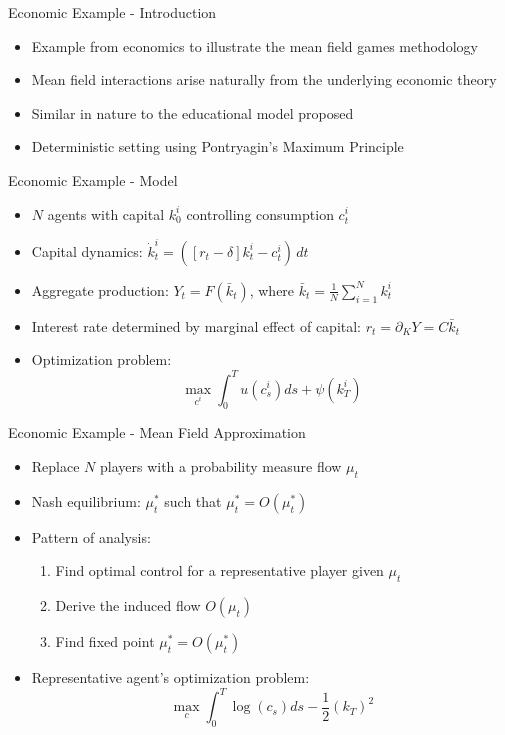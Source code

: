 \documentclass{beamer}
\begin{document}
\begin{frame}{Economic Example - Introduction}
\begin{itemize}
    \item Example from economics to illustrate the mean field games methodology
    \item Mean field interactions arise naturally from the underlying economic theory
    \item Similar in nature to the educational model proposed
    \item Deterministic setting using Pontryagin's Maximum Principle
\end{itemize}
\end{frame}

\begin{frame}{Economic Example - Model}
\begin{itemize}
    \item $N$ agents with capital $k_0^i$ controlling consumption $c_t^i$
    \item Capital dynamics: $\dot k_t^i = \left( \left[r_t - \delta \right] k_t^i - c_t^i \right)\, dt$
    \item Aggregate production: $Y_t = F(\bar k_t)$, where $\bar k_t = \frac{1}{N} \sum_{i = 1}^N k_t^i$
    \item Interest rate determined by marginal effect of capital: $r_t = \partial_K Y = C \bar k_t$
    \item Optimization problem: 
    \begin{equation}
        \max_{c^i } \int_0^T u(c^i_s) ds + \psi(k^i_T)
    \end{equation}
\end{itemize}
\end{frame}

\begin{frame}{Economic Example - Mean Field Approximation}
\begin{itemize}
    \item Replace $N$ players with a probability measure flow $\mu_t$
    \item Nash equilibrium: $\mu_t^*$ such that $\mu_t^* = O(\mu_t^*)$
    \item Pattern of analysis:
    \begin{enumerate}
        \item Find optimal control for a representative player given $\mu_t$
        \item Derive the induced flow $O(\mu_t)$
        \item Find fixed point $\mu_t^* = O(\mu_t^*)$
    \end{enumerate}
    \item Representative agent's optimization problem:
    \begin{equation}
        \max_{c} \int_0^T \log(c_s) ds -\frac{1}{2}{(k_T)}^2
    \end{equation}
\end{itemize}
\end{frame}
\end{document}
